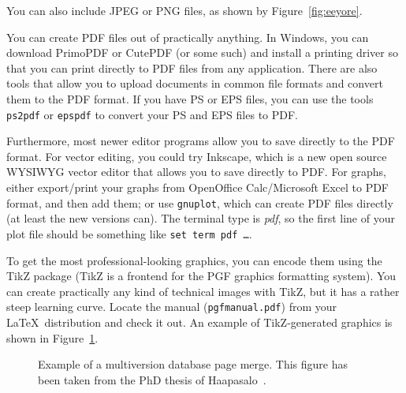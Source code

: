 \documentclass[12pt,a4paper,oneside,pdftex]{report}
\begin{document}
You can also include JPEG or PNG files, as shown by Figure~\ref{fig:eeyore}.



You can create PDF files out of practically anything.
In Windows, you can download PrimoPDF or CutePDF (or some such) and install a
printing driver so that you can print directly to PDF files from any
application. There are also tools that allow you to upload documents in common
file formats and convert them to the PDF format.
If you have PS or EPS files, you can use the tools \texttt{ps2pdf} or
\texttt{epspdf} to convert your PS and EPS files to PDF\@.



Furthermore, most newer editor programs allow you to save directly to the PDF
format. For vector editing, you could try Inkscape, which is a new open source
WYSIWYG vector editor that allows you to save directly to PDF\@.
For graphs, either export/print your graphs from OpenOffice Calc/Microsoft
Excel to PDF format, and then add them; or use \texttt{gnuplot}, which can
create PDF files directly (at least the new versions can).
The terminal type is \emph{pdf}, so the first line of your plot file should be
something like \texttt{set term pdf \ldots}.

To get the most professional-looking graphics, you can encode them using the
TikZ package (TikZ is a frontend for the PGF graphics formatting system).
You can create practically any kind of technical images with TikZ, but it has a
rather steep learning curve. Locate the manual (\texttt{pgfmanual.pdf}) from
your \LaTeX\ distribution and check it out. An example of TikZ-generated
graphics is shown in Figure~\ref{fig:page-merge}.

\begin{figure}[ht]
  \begin{center}
    
    \caption{Example of a multiversion database page merge. This figure has
    been taken from the PhD thesis of Haapasalo~\cite{HaapasaloThesis}.}
    \label{fig:page-merge}
  \end{center}
\end{figure}
\end{document}
